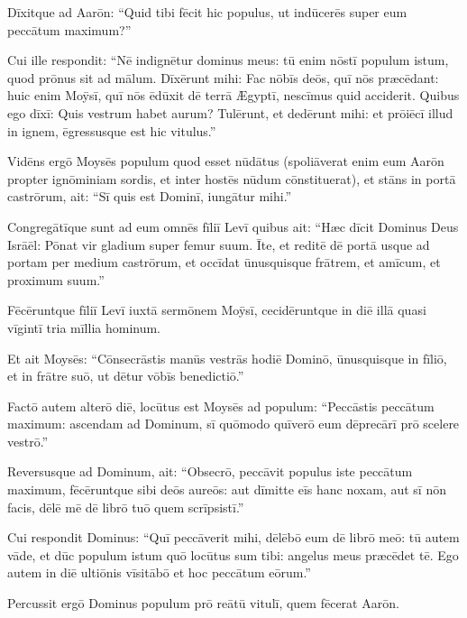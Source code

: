 Dīxitque ad Aarōn: ``Quid
tibi fēcit hic populus, ut indūcerēs super eum peccātum maximum?''

Cui
ille respondit: ``Nē indignētur dominus meus: tū enim nōstī
populum istum, quod prōnus sit ad mālum. 
Dīxērunt mihi: Fac nōbīs
deōs, quī nōs præcēdant: huic enim Moȳsī, quī nōs ēdūxit dē terrā Ægyptī,
nescīmus quid acciderit. 
Quibus ego dīxī: Quis vestrum habet aurum?
Tulērunt, et dedērunt mihi: et prōiēcī illud in ignem, ēgressusque est hic
vitulus.'' 

Vidēns ergō Moysēs populum
quod esset nūdātus (spoliāverat enim eum Aarōn propter
ignōminiam sordis, et inter hostēs nūdum cōnstituerat), 
et stāns in portā castrōrum, ait: ``Sī quis est Dominī, iungātur mihi.''

Congregātīque sunt ad eum omnēs fīliī Levī 
quibus ait: ``Hæc dīcit
Dominus Deus Isrāēl: Pōnat vir gladium super femur suum. Īte, et reditē
dē portā usque ad portam per medium castrōrum, et occīdat ūnusquisque
frātrem, et amīcum, et proximum suum.''

Fēcēruntque fīliī Levī iuxtā
sermōnem Moȳsī, cecidēruntque in diē illā quasi vīgintī tria mīllia
hominum. 

Et ait Moysēs: ``Cōnsecrāstis
manūs vestrās hodiē Dominō, ūnusquisque in fīliō, et in frātre suō, ut
dētur vōbīs benedictiō.''

Factō autem alterō diē, locūtus
est Moysēs ad populum: ``Peccāstis peccātum maximum: ascendam ad Dominum,
sī quōmodo quīverō eum dēprecārī prō scelere vestrō.''

Reversusque ad
Dominum, ait: ``Obsecrō, peccāvit populus
iste peccātum maximum, fēcēruntque sibi deōs aureōs: aut dīmitte eīs hanc
noxam, 
aut sī nōn facis, dēlē mē dē librō tuō quem
scrīpsistī.'' 

Cui respondit Dominus: ``Quī peccāverit mihi, dēlēbō eum dē
librō meō: 
tū autem vāde, et dūc populum istum quō locūtus sum tibi:
angelus meus præcēdet tē. Ego autem in diē
ultiōnis vīsitābō et hoc peccātum
eōrum.''

Percussit ergō Dominus populum prō reātū vitulī,
quem fēcerat Aarōn. 
